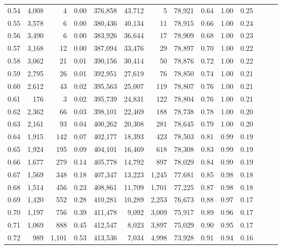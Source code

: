 \begin{tabular}{rrrrrrrrrrrrrr}
0.54 &  4,008 &      4 &  0.00 &  376,858 &   43,712 &       5 &  78,921 &  0.64 &  1.00 &      0.25 \\
0.55 &  3,578 &      6 &  0.00 &  380,436 &   40,134 &      11 &  78,915 &  0.66 &  1.00 &      0.24 \\
0.56 &  3,490 &      6 &  0.00 &  383,926 &   36,644 &      17 &  78,909 &  0.68 &  1.00 &      0.23 \\
0.57 &  3,168 &     12 &  0.00 &  387,094 &   33,476 &      29 &  78,897 &  0.70 &  1.00 &      0.22 \\
0.58 &  3,062 &     21 &  0.01 &  390,156 &   30,414 &      50 &  78,876 &  0.72 &  1.00 &      0.22 \\
0.59 &  2,795 &     26 &  0.01 &  392,951 &   27,619 &      76 &  78,850 &  0.74 &  1.00 &      0.21 \\
0.60 &  2,612 &     43 &  0.02 &  395,563 &   25,007 &     119 &  78,807 &  0.76 &  1.00 &      0.21 \\
0.61 &    176 &      3 &  0.02 &  395,739 &   24,831 &     122 &  78,804 &  0.76 &  1.00 &      0.21 \\
0.62 &  2,362 &     66 &  0.03 &  398,101 &   22,469 &     188 &  78,738 &  0.78 &  1.00 &      0.20 \\
0.63 &  2,161 &     93 &  0.04 &  400,262 &   20,308 &     281 &  78,645 &  0.79 &  1.00 &      0.20 \\
0.64 &  1,915 &    142 &  0.07 &  402,177 &   18,393 &     423 &  78,503 &  0.81 &  0.99 &      0.19 \\
0.65 &  1,924 &    195 &  0.09 &  404,101 &   16,469 &     618 &  78,308 &  0.83 &  0.99 &      0.19 \\
0.66 &  1,677 &    279 &  0.14 &  405,778 &   14,792 &     897 &  78,029 &  0.84 &  0.99 &      0.19 \\
0.67 &  1,569 &    348 &  0.18 &  407,347 &   13,223 &   1,245 &  77,681 &  0.85 &  0.98 &      0.18 \\
0.68 &  1,514 &    456 &  0.23 &  408,861 &   11,709 &   1,701 &  77,225 &  0.87 &  0.98 &      0.18 \\
0.69 &  1,420 &    552 &  0.28 &  410,281 &   10,289 &   2,253 &  76,673 &  0.88 &  0.97 &      0.17 \\
0.70 &  1,197 &    756 &  0.39 &  411,478 &    9,092 &   3,009 &  75,917 &  0.89 &  0.96 &      0.17 \\
0.71 &  1,069 &    888 &  0.45 &  412,547 &    8,023 &   3,897 &  75,029 &  0.90 &  0.95 &      0.17 \\
0.72 &    989 &  1,101 &  0.53 &  413,536 &    7,034 &   4,998 &  73,928 &  0.91 &  0.94 &      0.16 \\

\end{tabular}
